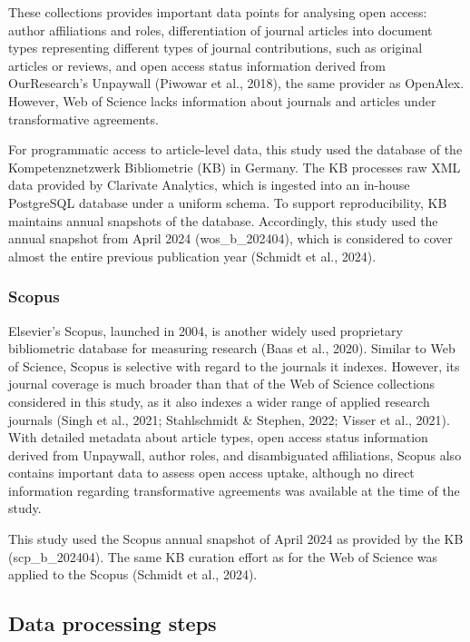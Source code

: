 \documentclass[a4paper,man,floatsintext,longtable,noextraspace,10pt]{apa6}
\begin{document}
These collections provides important data points for analysing open
access: author affiliations and roles, differentiation of journal
articles into document types representing different types of journal
contributions, such as original articles or reviews, and open access
status information derived from OurResearch's Unpaywall (Piwowar et al.,
2018), the same provider as OpenAlex. However, Web of Science lacks
information about journals and articles under transformative agreements.

For programmatic access to article-level data, this study used the
database of the Kompetenznetzwerk Bibliometrie (KB) in Germany. The KB
processes raw XML data provided by Clarivate Analytics, which is
ingested into an in-house PostgreSQL database under a uniform schema. To
support reproducibility, KB maintains annual snapshots of the database.
Accordingly, this study used the annual snapshot from April 2024
(wos\_b\_202404), which is considered to cover almost the entire
previous publication year (Schmidt et al., 2024).

\subsubsection{Scopus}\label{scopus}

Elsevier's Scopus, launched in 2004, is another widely used proprietary
bibliometric database for measuring research (Baas et al., 2020).
Similar to Web of Science, Scopus is selective with regard to the
journals it indexes. However, its journal coverage is much broader than
that of the Web of Science collections considered in this study, as it
also indexes a wider range of applied research journals (Singh et al.,
2021; Stahlschmidt \& Stephen, 2022; Visser et al., 2021). With detailed
metadata about article types, open access status information derived
from Unpaywall, author roles, and disambiguated affiliations, Scopus
also contains important data to assess open access uptake, although no
direct information regarding transformative agreements was available at
the time of the study.

This study used the Scopus annual snapshot of April 2024 as provided by
the KB (scp\_b\_202404). The same KB curation effort as for the Web of
Science was applied to the Scopus (Schmidt et al., 2024).

\subsection{Data processing steps}\label{data-processing-steps}
\end{document}
